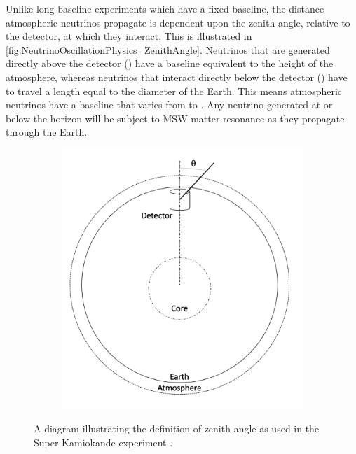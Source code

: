 Unlike long-baseline experiments which have a fixed baseline, the distance atmospheric neutrinos propagate is dependent upon the zenith angle, relative to the detector, at which they interact. This is illustrated in \autoref{fig:NeutrinoOscillationPhysics_ZenithAngle}. Neutrinos that are generated directly above the detector () have a baseline equivalent to the height of the atmosphere, whereas neutrinos that interact directly below the detector () have to travel a length equal to the diameter of the  Earth. This means atmospheric neutrinos have a baseline that varies from  to . Any neutrino generated at or below the horizon will be subject to MSW matter resonance as they propagate through the Earth.

\begin{figure}[h]
  \begin{subfigure}[t]{0.40\textwidth}
    \includegraphics[width=\textwidth, trim={0mm 0mm 0mm 0mm}, clip,page=1]{Figures/Theory/ZenithAngle.pdf}
  \end{subfigure}
  \caption{A diagram illustrating the definition of zenith angle as used in the Super Kamiokande experiment \cite{Ashie_2005}.}
  \label{fig:NeutrinoOscillationPhysics_ZenithAngle}
\end{figure}


